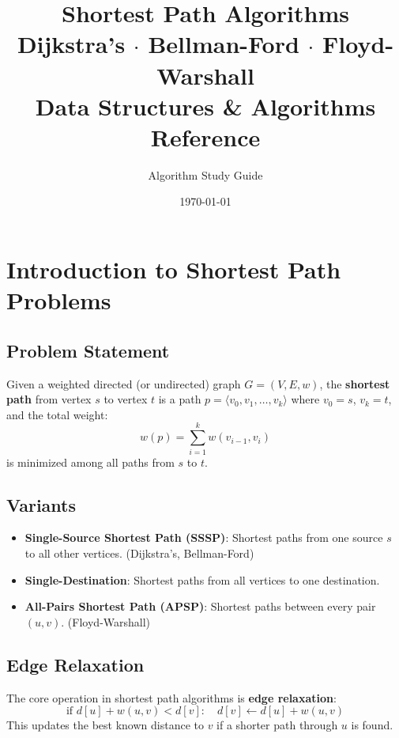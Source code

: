 \documentclass[12pt,a4paper]{article}
\title{
    \Huge \textbf{Shortest Path Algorithms} \\[0.5em]
    \Large Dijkstra's $\cdot$ Bellman-Ford $\cdot$ Floyd-Warshall \\[0.5em]
    \large Data Structures \& Algorithms Reference
}
\author{Algorithm Study Guide}
\date{\today}
\begin{document}
\maketitle
\tableofcontents
\newpage

\section{Introduction to Shortest Path Problems}

\subsection{Problem Statement}
Given a weighted directed (or undirected) graph $G = (V, E, w)$, the \textbf{shortest path} from vertex $s$ to vertex $t$ is a path $p = \langle v_0, v_1, \ldots, v_k \rangle$ where $v_0 = s$, $v_k = t$, and the total weight:
\[
w(p) = \sum_{i=1}^{k} w(v_{i-1}, v_i)
\]
is minimized among all paths from $s$ to $t$.

\subsection{Variants}
\begin{itemize}
    \item \textbf{Single-Source Shortest Path (SSSP)}: Shortest paths from one source $s$ to all other vertices. (Dijkstra's, Bellman-Ford)
    \item \textbf{Single-Destination}: Shortest paths from all vertices to one destination.
    \item \textbf{All-Pairs Shortest Path (APSP)}: Shortest paths between every pair $(u,v)$. (Floyd-Warshall)
\end{itemize}

\subsection{Edge Relaxation}
The core operation in shortest path algorithms is \textbf{edge relaxation}:
\[
\text{if } d[u] + w(u,v) < d[v]:\quad d[v] \leftarrow d[u] + w(u,v)
\]
This updates the best known distance to $v$ if a shorter path through $u$ is found.
\end{document}

